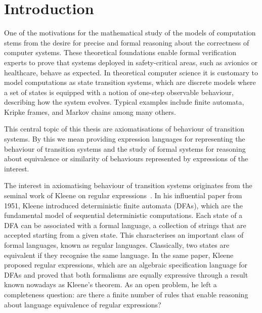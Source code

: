 \chapter{Introduction}
\label{chapter:introduction}
One of the motivations for the mathematical study of the models of computation stems from the desire for precise and formal reasoning about the correctness of computer systems. These theoretical foundations enable formal verification experts to prove that systems deployed in safety-critical areas, such as avionics or healthcare, behave as expected. In theoretical computer science it is customary to model computations as state transition systems, which are discrete models where a set of states is equipped with a notion of one-step observable behaviour, describing how the system evolves. Typical examples include finite automata, Kripke frames, and Markov chains among many others. 

	This central topic of this thesis are axiomatisations of behaviour of transition systems. By this we mean providing expression languages for representing the behaviour of transition systems and the study of formal systems for reasoning about equivalence or similarity of behaviours represented by expressions of the interest. 
	
	The interest in axiomatising behaviour of transition systems originates from the seminal work of Kleene on regular expressions~\cite{Kleene:1951:Representation}.  In his influential paper from 1951, Kleene introduced deterministic finite automata (DFAs), which are the fundamental model of sequential deterministic computations. Each state of a DFA can be associated with a formal language, a collection of strings that are accepted starting from a given state. This characterises an important class of formal languages, known as regular languages. Classically, two states are equivalent if they recognise the same language. In the same paper, Kleene proposed regular expressions, which are an algebraic specification language for DFAs and proved that both formalisms are equally expressive through a result known nowadays as Kleene’s theorem. As an open problem, he left a completeness question: are there a finite number of rules that enable reasoning about language equivalence of regular expressions? 

